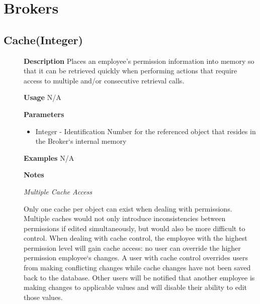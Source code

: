 \documentclass[letterpaper,12pt]{report}
\begin{document}
{
\chapter{Brokers}
}


{
\pagebreak
\section{Cache(Integer)}
    \begin{description}
      \item[] \textbf{Description}
	  \newline \hspace*{1cm} Places an employee's permission information into memory so that it can be retrieved quickly when performing actions that require access to multiple and/or consecutive retrieval calls. 
      \item[] \textbf{Usage}
	  \newline \hspace*{1cm} N/A
      \item[] \textbf{Parameters}
	  \begin{itemize}
	   \item Integer - Identification Number for the referenced object that resides in the Broker`s internal memory
	  \end{itemize}
      \item[] \textbf{Examples}
	  \newline \hspace*{1cm} N/A
      \item[] \textbf{Notes}
	  \par \noindent
	  \textit{Multiple Cache Access}
	  \par \noindent \hspace*{1cm} Only one cache per object can exist when dealing with permissions. Multiple caches would not only introduce inconsistencies between permissions if edited simultaneously, but would also be more difficult to control. When dealing with cache control, the employee with the highest permission level will gain cache access: no user can override the higher permission employee`s changes. A user with cache control overrides users from making conflicting changes while cache changes have not been saved back to the database. Other users will be notified that another employee is making changes to applicable values and will disable their ability to edit those values. 

\end{description}}
\end{document}
